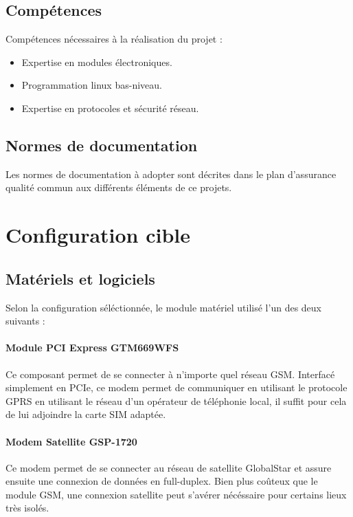 \subsection{Compétences}

Compétences nécessaires à la réalisation du projet :

\begin{itemize}
\item Expertise en modules électroniques.
\item Programmation linux bas-niveau.
\item Expertise en protocoles et sécurité réseau.
\end{itemize}

\subsection{Normes de documentation}

Les normes de documentation à adopter sont décrites dans le plan d'assurance qualité commun aux différents éléments de ce projets.

\section{Configuration cible}

\subsection{Matériels et logiciels}

Selon la configuration séléctionnée, le module matériel utilisé l'un des deux suivants :

\paragraph{Module PCI Express GTM669WFS}

Ce composant permet de se connecter à n'importe quel réseau GSM. Interfacé simplement en PCIe, ce modem permet de communiquer en utilisant le protocole GPRS en utilisant le réseau d'un opérateur de téléphonie local, il suffit pour cela de lui adjoindre la carte SIM adaptée.

\paragraph{Modem Satellite GSP-1720}

Ce modem permet de se connecter au réseau de satellite GlobalStar et assure ensuite une connexion de données en full-duplex. Bien plus coûteux que le module GSM, une connexion satellite peut s'avérer nécéssaire pour certains lieux très isolés.

